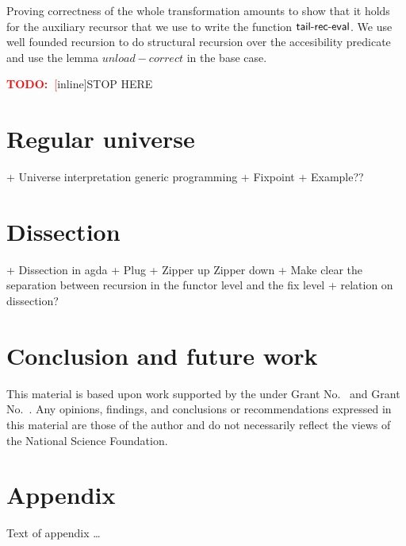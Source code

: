 \documentclass[sigplan,10pt,review]{acmart}
\newcommand\todo[1]{\textcolor{red}{\textbf{TODO:~}#1}}
\newcommand{\AF}{\AgdaFunction}
\newcommand{\Varid}[1]{\mathit{#1}}
\begin{document}
Proving correctness of the whole transformation amounts to show that it holds for the
auxiliary recursor that we use to write the function \ensuremath{\AF{tail\text{-}rec\text{-}eval}}. We use well founded 
recursion to do structural recursion over the accesibility predicate and use the lemma 
\ensuremath{\Varid{unload-correct}} in the base case.

\todo[inline]{STOP HERE}

\section{Regular universe}
  + Universe interpretation generic programming
  + Fixpoint
  + Example??
\section{Dissection}
  + Dissection in agda
  + Plug
  + Zipper up Zipper down
  + Make clear the separation between recursion in the functor level and
  the fix level
  + relation on dissection?
  
\section{Conclusion and future work}

\begin{acks}                            %
  This material is based upon work supported by the
   under Grant
  No.~ and Grant
  No.~.  Any opinions, findings, and
  conclusions or recommendations expressed in this material are those
  of the author and do not necessarily reflect the views of the
  National Science Foundation.
\end{acks}






\appendix
\section{Appendix}

Text of appendix \ldots
\end{document}
